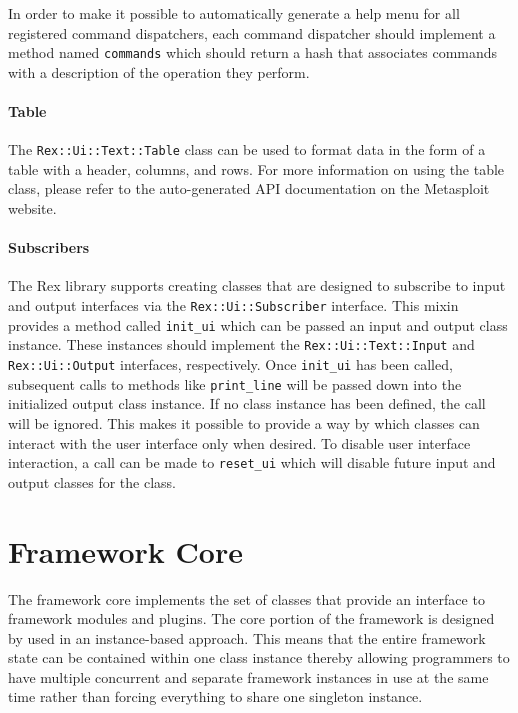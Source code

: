 \documentclass{report}
\begin{document}
\par
In order to make it possible to automatically generate a help menu
for all registered command dispatchers, each command dispatcher
should implement a method named \texttt{commands} which should
return a hash that associates commands with a description of the
operation they perform.

            \subsubsection{Table}

\par
The \texttt{Rex::Ui::Text::Table} class can be used to format data
in the form of a table with a header, columns, and rows.  For more
information on using the table class, please refer to the
auto-generated API documentation on the Metasploit website.

            \subsubsection{Subscribers}

\par
The Rex library supports creating classes that are designed to
subscribe to input and output interfaces via the
\texttt{Rex::Ui::Subscriber} interface.  This mixin provides a
method called \texttt{init\_ui} which can be passed an input and
output class instance.  These instances should implement the
\texttt{Rex::Ui::Text::Input} and \texttt{Rex::Ui::Output}
interfaces, respectively.  Once \texttt{init\_ui} has been called,
subsequent calls to methods like \texttt{print\_line} will be passed
down into the initialized output class instance.  If no class
instance has been defined, the call will be ignored.  This makes it
possible to provide a way by which classes can interact with the
user interface only when desired.  To disable user interface
interaction, a call can be made to \texttt{reset\_ui} which will
disable future input and output classes for the class.

\chapter{Framework Core}

\par
The framework core implements the set of classes that provide an
interface to framework modules and plugins.  The core portion of the
framework is designed by used in an instance-based approach.  This
means that the entire framework state can be contained within one
class instance thereby allowing programmers to have multiple
concurrent and separate framework instances in use at the same time
rather than forcing everything to share one singleton instance.
\end{document}
